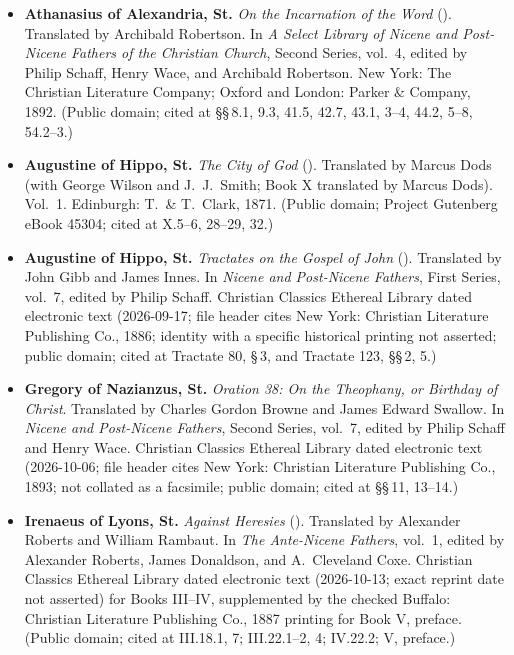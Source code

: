 \begin{itemize}
\item \textbf{Athanasius of Alexandria, St.} \textit{On the Incarnation of the Word} (). Translated by Archibald Robertson. In \textit{A Select Library of Nicene and Post-Nicene Fathers of the Christian Church}, Second Series, vol.\ 4, edited by Philip Schaff, Henry Wace, and Archibald Robertson. New York: The Christian Literature Company; Oxford and London: Parker \& Company, 1892. (Public domain; cited at \S\S\,8.1, 9.3, 41.5, 42.7, 43.1, 3--4, 44.2, 5--8, 54.2--3.)
\item \textbf{Augustine of Hippo, St.} \textit{The City of God} (). Translated by Marcus Dods (with George Wilson and J.\ J.\ Smith; Book X translated by Marcus Dods). Vol.\ 1. Edinburgh: T.\ \& T.\ Clark, 1871. (Public domain; Project Gutenberg eBook 45304; cited at X.5--6, 28--29, 32.)
\item \textbf{Augustine of Hippo, St.} \textit{Tractates on the Gospel of John} (). Translated by John Gibb and James Innes. In \textit{Nicene and Post-Nicene Fathers}, First Series, vol.\ 7, edited by Philip Schaff. Christian Classics Ethereal Library dated electronic text (2026-09-17; file header cites New York: Christian Literature Publishing Co., 1886; identity with a specific historical printing not asserted; public domain; cited at Tractate 80, \S\,3, and Tractate 123, \S\S\,2, 5.)
\item \textbf{Gregory of Nazianzus, St.} \textit{Oration 38: On the Theophany, or Birthday of Christ}. Translated by Charles Gordon Browne and James Edward Swallow. In \textit{Nicene and Post-Nicene Fathers}, Second Series, vol.\ 7, edited by Philip Schaff and Henry Wace. Christian Classics Ethereal Library dated electronic text (2026-10-06; file header cites New York: Christian Literature Publishing Co., 1893; not collated as a facsimile; public domain; cited at \S\S\,11, 13--14.)
\item \textbf{Irenaeus of Lyons, St.} \textit{Against Heresies} (). Translated by Alexander Roberts and William Rambaut. In \textit{The Ante-Nicene Fathers}, vol.\ 1, edited by Alexander Roberts, James Donaldson, and A.\ Cleveland Coxe. Christian Classics Ethereal Library dated electronic text (2026-10-13; exact reprint date not asserted) for Books III--IV, supplemented by the checked Buffalo: Christian Literature Publishing Co., 1887 printing for Book V, preface. (Public domain; cited at III.18.1, 7; III.22.1--2, 4; IV.22.2; V, preface.)

\end{itemize}
